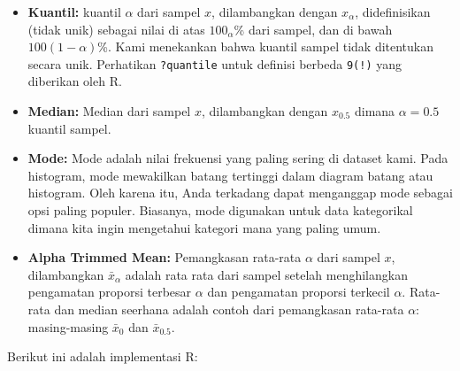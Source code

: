 \documentclass[
]{book}
\newenvironment{Shaded}{\begin{snugshade}}{\end{snugshade}}
\newcommand{\CommentTok}[1]{\textcolor[rgb]{0.56,0.35,0.01}{\textit{#1}}}
\newcommand{\KeywordTok}[1]{\textcolor[rgb]{0.13,0.29,0.53}{\textbf{#1}}}
\newcommand{\NormalTok}[1]{#1}
\newcommand{\OperatorTok}[1]{\textcolor[rgb]{0.81,0.36,0.00}{\textbf{#1}}}
\newcommand{\StringTok}[1]{\textcolor[rgb]{0.31,0.60,0.02}{#1}}
\begin{document}
\begin{itemize}
\item
  \textbf{Kuantil:} kuantil \(\alpha\) dari sampel \(x\), dilambangkan dengan \(x_\alpha\), didefinisikan (tidak unik) sebagai nilai di atas \(100_\alpha\)\% dari sampel, dan di bawah \(100(1-\alpha)\)\%. Kami menekankan bahwa kuantil sampel tidak ditentukan secara unik. Perhatikan \texttt{?quantile} untuk definisi berbeda \texttt{9(!)} yang diberikan oleh R.
\item
  \textbf{Median:} Median dari sampel \(x\), dilambangkan dengan \(x_{0.5}\) dimana \(\alpha=0.5\) kuantil sampel.
\item
  \textbf{Mode:} Mode adalah nilai frekuensi yang paling sering di dataset kami. Pada histogram, mode mewakilkan batang tertinggi dalam diagram batang atau histogram. Oleh karena itu, Anda terkadang dapat menganggap mode sebagai opsi paling populer. Biasanya, mode digunakan untuk data kategorikal dimana kita ingin mengetahui kategori mana yang paling umum.
\item
  \textbf{Alpha Trimmed Mean:} Pemangkasan rata-rata \(\alpha\) dari sampel \(x\), dilambangkan \(\bar{x}_\alpha\) adalah rata rata dari sampel setelah menghilangkan pengamatan proporsi terbesar \(\alpha\) dan pengamatan proporsi terkecil \(\alpha\). Rata-rata dan median seerhana adalah contoh dari pemangkasan rata-rata \(\alpha\): masing-masing \(\bar{x}_0\) dan \(\bar{x}_{0.5}\).
\end{itemize}

Berikut ini adalah implementasi R:

\begin{Shaded}
\end{Shaded}
\end{document}
